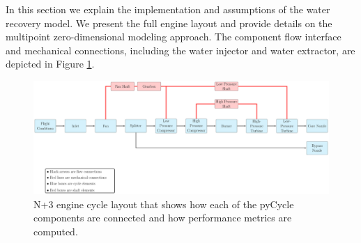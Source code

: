 \documentclass[conf]{new-aiaa}
\begin{document}
In this section we explain the implementation and assumptions of the water recovery model.
We present the full engine layout and provide details on the multipoint zero-dimensional modeling approach.
The component flow interface and mechanical connections, including the water injector and water extractor, are depicted in Figure \ref{fig:N3_original}.

\begin{figure}[hbt!]
  \centering
  \includegraphics[width=1.0\textwidth]{N3_cycle.pdf}
  \caption{
    N+3 engine cycle layout that shows how each of the pyCycle components are connected and how performance metrics are computed. %
  }
  \label{fig:N3_original}
\end{figure}
\end{document}
